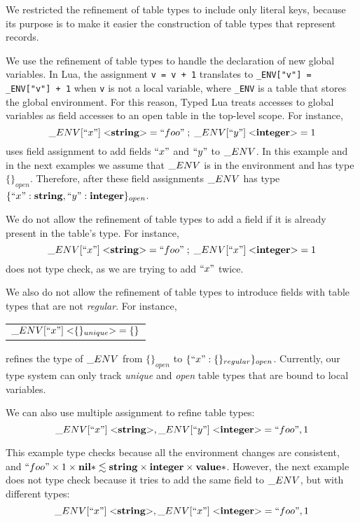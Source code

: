 We restricted the refinement of table types to include only literal
keys, because its purpose is to make it easier the construction of
table types that represent records.

We use the refinement of table types to handle the declaration of
new global variables.
In Lua, the assignment \texttt{v = v + 1} translates to
\texttt{\string_ENV["v"] = \string_ENV["v"] + 1} when \texttt{v}
is not a local variable, where \texttt{\string_ENV} is a table
that stores the global environment.
For this reason, Typed Lua treats accesses to global variables as field accesses
to an open table in the top-level scope.
For instance,
\[
\string_ENV[``x"] \; {<}\String{>} = ``foo" \;;\; \string_ENV[``y"] \; {<}\Integer{>} = 1
\]
uses field assignment to add fields $``x"$ and $``y"$ to $\string_ENV$.
In this example and in the next examples we assume that
$\string_ENV$ is in the environment and has type $\{\}_{open}$.
Therefore, after these field assignments $\string_ENV$ has type
$\{``x":\mathbf{string}, ``y":\mathbf{integer}\}_{open}$.

We do not allow the refinement of table types to add a field if it is
already present in the table's type.
For instance,
\[
\string_ENV[``x"] \; {<}\String{>} = ``foo" \;;\; \string_ENV[``x"] \; {<}\Integer{>} = 1
\]
does not type check, as we are trying to add $``x"$ twice.

We also do not allow the refinement of table types to introduce
fields with table types that are not \emph{regular}.
For instance,
\begin{center}
\begin{tabular}{l}
$\string_ENV[``x"] \; {<}\{\}_{unique}{>} = \{\}$
\end{tabular}
\end{center}
refines the type of $\string_ENV$ from $\{\}_{open}$ to $\{``x":\{\}_{regular}\}_{open}$.
Currently, our type system can only track \emph{unique} and
\emph{open} table types that are bound to local variables.

We can also use multiple assignment to refine table types:
\[
\string_ENV[``x"] \; {<}\String{>}, \string_ENV[``y"] \; {<}\Integer{>} = ``foo", 1
\]

This example type checks because all the environment changes are consistent, and
$``foo" \times 1 \times \mathbf{nil}{*} \lesssim \mathbf{string} \times \mathbf{integer} \times \mathbf{value}{*}$.
However, the next example does not type check because it tries to add
the same field to $\string_ENV$, but with different types:
\[
\string_ENV[``x"] \; {<}\String{>}, \string_ENV[``x"] \; {<}\Integer{>} = ``foo", 1
\]

